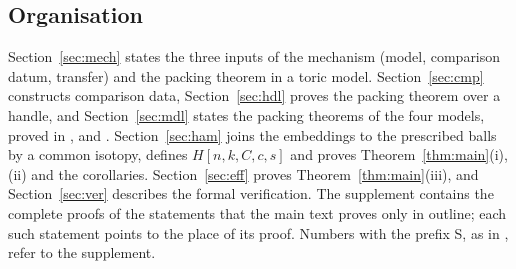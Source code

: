 \subsection{Organisation}\label{sec:intro-organisation}

Section~\ref{sec:mech} states the three inputs of the mechanism (model, comparison datum, transfer) and the
packing theorem in a toric model. Section~\ref{sec:cmp} constructs comparison data, Section~\ref{sec:hdl} proves the
packing theorem over a handle, and Section~\ref{sec:mdl} states the packing theorems of the four models, proved in
,  and . Section~\ref{sec:ham} joins the
embeddings to the prescribed balls by a common isotopy, defines $H[n,k,C,c,s]$ and proves
Theorem~\ref{thm:main}(i),(ii) and the corollaries. Section~\ref{sec:eff} proves Theorem~\ref{thm:main}(iii), and
Section~\ref{sec:ver} describes the formal verification. The supplement contains the complete proofs of the
statements that the main text proves only in outline; each such statement points to the place of its proof. Numbers
with the prefix S, as in , refer to the supplement.
